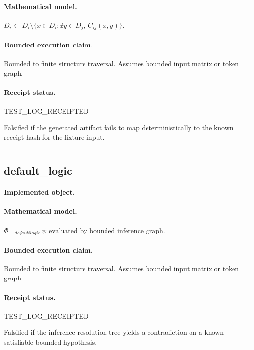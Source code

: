 \paragraph{Mathematical model.} $D_i\leftarrow D_i\setminus \{x\in D_i:\nexists y\in D_j,\ C_{ij}(x,y)\}.$
\paragraph{Bounded execution claim.} Bounded to finite structure traversal. Assumes bounded input matrix or token graph.
\paragraph{Receipt status.} TEST\_LOG\_RECEIPTED
\begin{falsifier}
Falsified if the generated artifact fails to map deterministically to the known receipt hash for the fixture input.
\end{falsifier}

\vspace{1em}\hrule\vspace{1em}
\subsection{default\_logic}
\paragraph{Implemented object.} 
\paragraph{Mathematical model.} $\Phi \vdash_{defaultlogic} \psi \text{ evaluated by bounded inference graph}.$
\paragraph{Bounded execution claim.} Bounded to finite structure traversal. Assumes bounded input matrix or token graph.
\paragraph{Receipt status.} TEST\_LOG\_RECEIPTED
\begin{falsifier}
Falsified if the inference resolution tree yields a contradiction on a known-satisfiable bounded hypothesis.
\end{falsifier}

